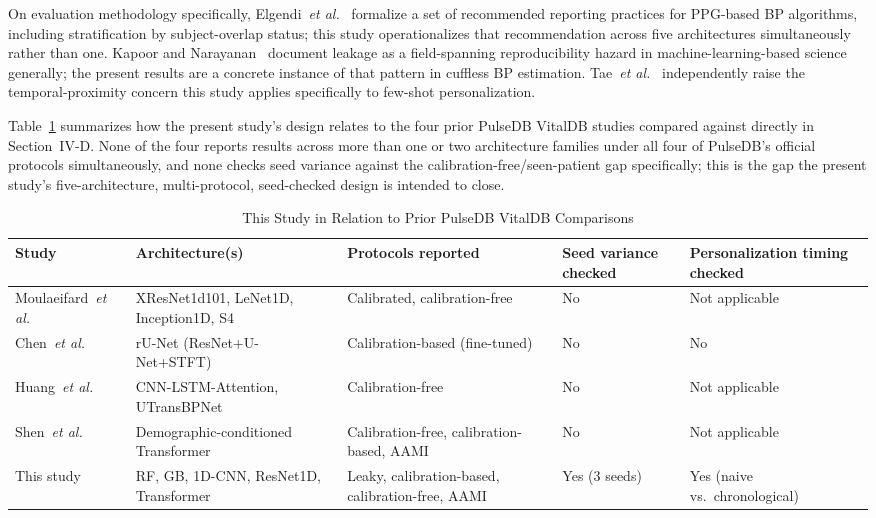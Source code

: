 \documentclass[journal]{IEEEtran}
\begin{document}
On evaluation methodology specifically, Elgendi~\textit{et al.}~\cite{elgendi2024} formalize a set of recommended reporting practices for PPG-based BP algorithms, including stratification by subject-overlap status; this study operationalizes that recommendation across five architectures simultaneously rather than one. Kapoor and Narayanan~\cite{kapoor2023} document leakage as a field-spanning reproducibility hazard in machine-learning-based science generally; the present results are a concrete instance of that pattern in cuffless BP estimation. Tae~\textit{et al.}~\cite{tae2026} independently raise the temporal-proximity concern this study applies specifically to few-shot personalization.

Table~\ref{tab:related} summarizes how the present study's design relates to the four prior PulseDB VitalDB studies compared against directly in Section~IV-D. None of the four reports results across more than one or two architecture families under all four of PulseDB's official protocols simultaneously, and none checks seed variance against the calibration-free/seen-patient gap specifically; this is the gap the present study's five-architecture, multi-protocol, seed-checked design is intended to close.

\begin{table}[!t]
\caption{This Study in Relation to Prior PulseDB VitalDB Comparisons}
\label{tab:related}
\centering
\begin{tabular}{p{2.3cm}p{3.0cm}p{3.5cm}p{2.3cm}p{3.4cm}}
\toprule
Study & Architecture(s) & Protocols reported & Seed variance checked & Personalization timing checked \\
\midrule
Moulaeifard~\textit{et al.}~\cite{moulaeifard2025} & XResNet1d101, LeNet1D, Inception1D, S4 & Calibrated, calibration-free & No & Not applicable \\
Chen~\textit{et al.}~\cite{chen2024} & rU-Net (ResNet+U-Net+STFT) & Calibration-based (fine-tuned) & No & No \\
Huang~\textit{et al.}~\cite{huang2024} & CNN-LSTM-Attention, UTransBPNet & Calibration-free & No & Not applicable \\
Shen~\textit{et al.}~\cite{shen2026} & Demographic-conditioned Transformer & Calibration-free, calibration-based, AAMI & No & Not applicable \\
This study & RF, GB, 1D-CNN, ResNet1D, Transformer & Leaky, calibration-based, calibration-free, AAMI & Yes (3 seeds) & Yes (naive vs.\ chronological) \\
\bottomrule
\end{tabular}
\end{table}
\end{document}
